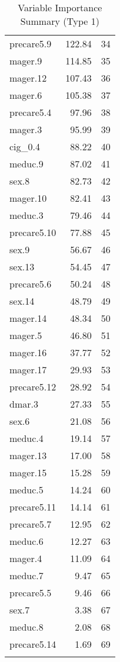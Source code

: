 \begin{longtable}{lrr}
  precare5.9 & 122.84 & 34 \\ 
  mager.9 & 114.85 & 35 \\ 
  mager.12 & 107.43 & 36 \\ 
  mager.6 & 105.38 & 37 \\ 
  precare5.4 & 97.96 & 38 \\ 
  mager.3 & 95.99 & 39 \\ 
  cig_0.4 & 88.22 & 40 \\ 
  meduc.9 & 87.02 & 41 \\ 
  sex.8 & 82.73 & 42 \\ 
  mager.10 & 82.41 & 43 \\ 
  meduc.3 & 79.46 & 44 \\ 
  precare5.10 & 77.88 & 45 \\ 
  sex.9 & 56.67 & 46 \\ 
  sex.13 & 54.45 & 47 \\ 
  precare5.6 & 50.24 & 48 \\ 
  sex.14 & 48.79 & 49 \\ 
  mager.14 & 48.34 & 50 \\ 
  mager.5 & 46.80 & 51 \\ 
  mager.16 & 37.77 & 52 \\ 
  mager.17 & 29.93 & 53 \\ 
  precare5.12 & 28.92 & 54 \\ 
  dmar.3 & 27.33 & 55 \\ 
  sex.6 & 21.08 & 56 \\ 
  meduc.4 & 19.14 & 57 \\ 
  mager.13 & 17.00 & 58 \\ 
  mager.15 & 15.28 & 59 \\ 
  meduc.5 & 14.24 & 60 \\ 
  precare5.11 & 14.14 & 61 \\ 
  precare5.7 & 12.95 & 62 \\ 
  meduc.6 & 12.27 & 63 \\ 
  mager.4 & 11.09 & 64 \\ 
  meduc.7 & 9.47 & 65 \\ 
  precare5.5 & 9.46 & 66 \\ 
  sex.7 & 3.38 & 67 \\ 
  meduc.8 & 2.08 & 68 \\ 
  precare5.14 & 1.69 & 69 \\ 
   \hline
\hline
\caption{Variable Importance Summary (Type 1)} 
\label{tab:var_imp_summary_type1}
\end{longtable}
\endgroup
